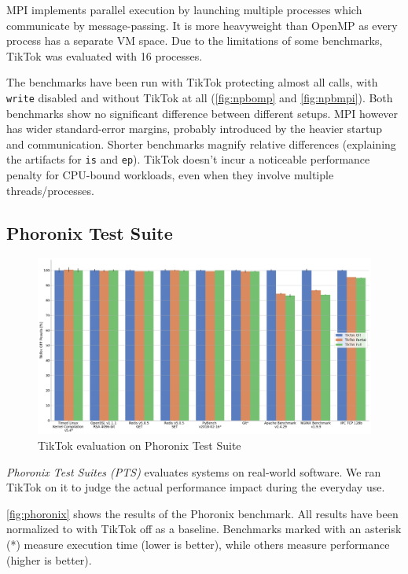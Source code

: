 \documentclass[conference]{IEEEtran}
\newcommand{\sysname}{TikTok}
\begin{document}
MPI implements parallel execution by launching multiple processes which communicate
by message-passing. It is more heavyweight than OpenMP as every process has a
separate VM space. Due to the limitations of some benchmarks, \sysname{} was 
evaluated with 16 processes.

The benchmarks have been run with \sysname{} protecting almost all calls, with
\texttt{write} disabled and without \sysname{} at all (\autoref{fig:npbomp} and
\autoref{fig:npbmpi}). Both benchmarks show no significant difference between
different setups. MPI however has wider standard-error margins, probably
introduced by the heavier startup and communication. Shorter benchmarks magnify
relative differences (explaining the artifacts for \texttt{is} and \texttt{ep}).
\sysname{} doesn't incur a noticeable performance
penalty for CPU-bound workloads, even when they involve multiple
threads/processes.

\subsection{Phoronix Test Suite}
\label{subsec:phoronix}

\begin{figure}[]
  \centering
  \includegraphics[width=\linewidth]{graphs/phoronix.png}
  \caption{\sysname{} evaluation on Phoronix Test Suite}
  \label{fig:phoronix}
\end{figure}

\emph{Phoronix Test Suites (PTS)} evaluates systems on real-world software. We
ran \sysname{} on it to judge the actual performance impact during the
everyday use.

\autoref{fig:phoronix} shows the results of the Phoronix benchmark. All
results have been normalized to with \sysname{} off as a baseline. Benchmarks
marked with an asterisk (*) measure execution time (lower is better), while others
measure performance (higher is better).
\end{document}
